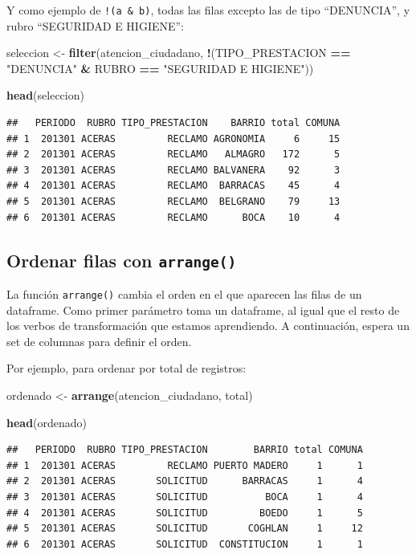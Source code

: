 \documentclass[]{book}
\newenvironment{Shaded}{\begin{snugshade}}{\end{snugshade}}
\newcommand{\KeywordTok}[1]{\textcolor[rgb]{0.13,0.29,0.53}{\textbf{#1}}}
\newcommand{\StringTok}[1]{\textcolor[rgb]{0.31,0.60,0.02}{#1}}
\newcommand{\OperatorTok}[1]{\textcolor[rgb]{0.81,0.36,0.00}{\textbf{#1}}}
\newcommand{\NormalTok}[1]{#1}
\begin{document}
Y como ejemplo de \texttt{!(a\ \&\ b)}, todas las filas excepto las de
tipo ``DENUNCIA'', y rubro ``SEGURIDAD E HIGIENE'':

\begin{Shaded}
\begin{Highlighting}[]
\NormalTok{seleccion <-}\StringTok{ }\KeywordTok{filter}\NormalTok{(atencion_ciudadano, }\OperatorTok{!}\NormalTok{(TIPO_PRESTACION }\OperatorTok{==}\StringTok{ "DENUNCIA"} \OperatorTok{&}\StringTok{ }\NormalTok{RUBRO }\OperatorTok{==}\StringTok{ "SEGURIDAD E HIGIENE"}\NormalTok{))}

\KeywordTok{head}\NormalTok{(seleccion)}
\end{Highlighting}
\end{Shaded}

\begin{verbatim}
##   PERIODO  RUBRO TIPO_PRESTACION    BARRIO total COMUNA
## 1  201301 ACERAS         RECLAMO AGRONOMIA     6     15
## 2  201301 ACERAS         RECLAMO   ALMAGRO   172      5
## 3  201301 ACERAS         RECLAMO BALVANERA    92      3
## 4  201301 ACERAS         RECLAMO  BARRACAS    45      4
## 5  201301 ACERAS         RECLAMO  BELGRANO    79     13
## 6  201301 ACERAS         RECLAMO      BOCA    10      4
\end{verbatim}

\subsection{\texorpdfstring{Ordenar filas con
\texttt{arrange()}}{Ordenar filas con arrange()}}\label{ordenar-filas-con-arrange}

La función \texttt{arrange()} cambia el orden en el que aparecen las
filas de un dataframe. Como primer parámetro toma un dataframe, al igual
que el resto de los verbos de transformación que estamos aprendiendo. A
continuación, espera un set de columnas para definir el orden.

Por ejemplo, para ordenar por total de registros:

\begin{Shaded}
\begin{Highlighting}[]
\NormalTok{ordenado <-}\StringTok{ }\KeywordTok{arrange}\NormalTok{(atencion_ciudadano, total)}

\KeywordTok{head}\NormalTok{(ordenado)}
\end{Highlighting}
\end{Shaded}

\begin{verbatim}
##   PERIODO  RUBRO TIPO_PRESTACION        BARRIO total COMUNA
## 1  201301 ACERAS         RECLAMO PUERTO MADERO     1      1
## 2  201301 ACERAS       SOLICITUD      BARRACAS     1      4
## 3  201301 ACERAS       SOLICITUD          BOCA     1      4
## 4  201301 ACERAS       SOLICITUD         BOEDO     1      5
## 5  201301 ACERAS       SOLICITUD       COGHLAN     1     12
## 6  201301 ACERAS       SOLICITUD  CONSTITUCION     1      1
\end{verbatim}
\end{document}
